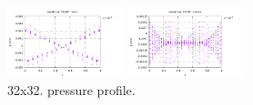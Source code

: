 \begin{center}
\includegraphics[width=3.4cm]{python_codes/fieldstone_115/results/dh/pressure_local_error.pdf}
\includegraphics[width=3.4cm]{python_codes/fieldstone_115/results/dh/pressure_macro_error.pdf}\\
{\captionfont 32x32. pressure profile.} 
\end{center}

